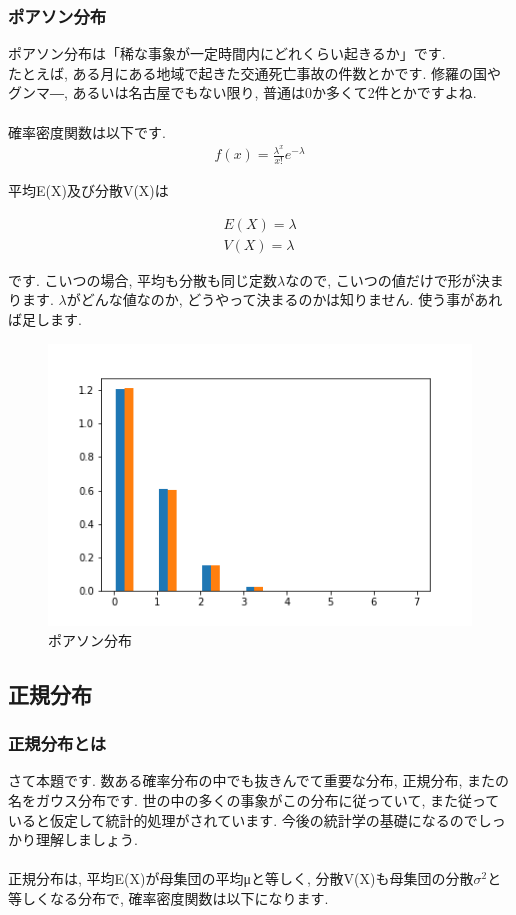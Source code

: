 \documentclass[11pt,a4paper,uplatex]{ujreport} 	%
\begin{document}
\subsubsection{ポアソン分布}
ポアソン分布は「稀な事象が一定時間内にどれくらい起きるか」です.\\
たとえば, ある月にある地域で起きた交通死亡事故の件数とかです. 修羅の国やグンマ―, あるいは名古屋でもない限り, 普通は0か多くて2件とかですよね.\\
\\
確率密度関数は以下です.
\begin{eqnarray}
f(x) = \frac{\lambda^x}{x!}e^{-\lambda}
\end{eqnarray}

平均E(X)及び分散V(X)は

\begin{eqnarray}
E(X) = \lambda\\
V(X) = \lambda
\end{eqnarray}

です. こいつの場合, 平均も分散も同じ定数$\lambda$なので, こいつの値だけで形が決まります. $\lambda$がどんな値なのか, どうやって決まるのかは知りません. 使う事があれば足します.\\

\begin{figure}[H]
\label{im:poisson}
  \centering
  \includegraphics[width=120mm,bb=0 0 432 288]{figures/poisson.png}
  \caption{ポアソン分布}
\end{figure}

\subsection{正規分布}
\subsubsection{正規分布とは}
さて本題です. 数ある確率分布の中でも抜きんでて重要な分布, 正規分布, またの名をガウス分布です. 世の中の多くの事象がこの分布に従っていて, また従っていると仮定して統計的処理がされています. 今後の統計学の基礎になるのでしっかり理解しましょう.\\
\\
正規分布は, 平均E(X)が母集団の平均μと等しく, 分散V(X)も母集団の分散$\sigma ^2$と等しくなる分布で, 確率密度関数は以下になります.
\end{document}
